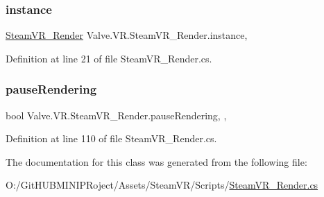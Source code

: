 \subsubsection{\texorpdfstring{instance}{instance}}
{\footnotesize\ttfamily \mbox{\hyperlink{class_valve_1_1_v_r_1_1_steam_v_r___render}{Steam\+V\+R\+\_\+\+Render}} Valve.\+V\+R.\+Steam\+V\+R\+\_\+\+Render.\+instance\hspace{0.3cm}{\ttfamily [static]}, {\ttfamily [get]}}



Definition at line 21 of file Steam\+V\+R\+\_\+\+Render.\+cs.

\mbox{\label{class_valve_1_1_v_r_1_1_steam_v_r___render_ad0d6a11827b9c94df738a6e3669a0e70}} 
\subsubsection{\texorpdfstring{pauseRendering}{pauseRendering}}
{\footnotesize\ttfamily bool Valve.\+V\+R.\+Steam\+V\+R\+\_\+\+Render.\+pause\+Rendering\hspace{0.3cm}{\ttfamily [static]}, {\ttfamily [get]}, {\ttfamily [set]}}



Definition at line 110 of file Steam\+V\+R\+\_\+\+Render.\+cs.



The documentation for this class was generated from the following file\+:\begin{DoxyCompactItemize}
\item 
O\+:/\+Git\+H\+U\+B\+M\+I\+N\+I\+P\+Roject/\+Assets/\+Steam\+V\+R/\+Scripts/\mbox{\hyperlink{_steam_v_r___render_8cs}{Steam\+V\+R\+\_\+\+Render.\+cs}}\end{DoxyCompactItemize}
